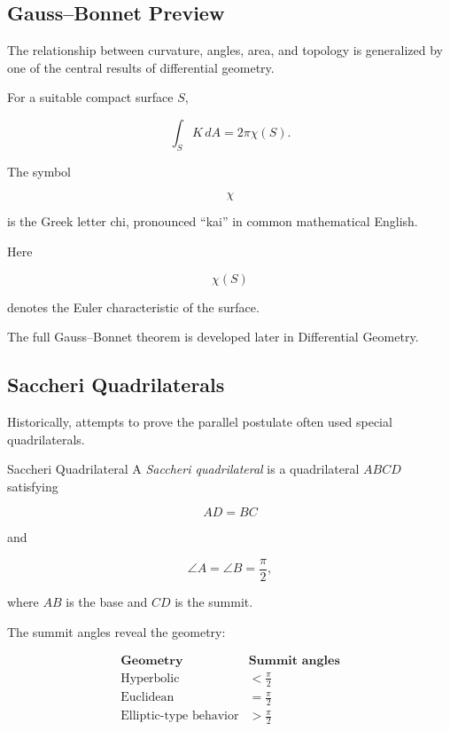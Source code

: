 \subsection{Gauss--Bonnet Preview}
\label{subsec:gauss-bonnet-preview}

The relationship between curvature, angles, area, and topology is generalized
by one of the central results of differential geometry.

For a suitable compact surface \(S\),

\[
\boxed{
\int_S K\,dA
=
2\pi\chi(S).
}
\]

The symbol

\[
\chi
\]

is the Greek letter chi, pronounced ``kai'' in common mathematical English.

Here

\[
\chi(S)
\]

denotes the Euler characteristic of the surface.

The full Gauss--Bonnet theorem is developed later in Differential Geometry.

\subsection{Saccheri Quadrilaterals}
\label{subsec:saccheri-quadrilaterals}

Historically, attempts to prove the parallel postulate often used special
quadrilaterals.

\begin{definitionbox}{Saccheri Quadrilateral}
A \emph{Saccheri quadrilateral} is a quadrilateral \(ABCD\) satisfying

\[
AD=BC
\]

and

\[
\angle A=\angle B=\frac{\pi}{2},
\]

where \(AB\) is the base and \(CD\) is the summit.
\end{definitionbox}

The summit angles reveal the geometry:

\[
\begin{array}{c|c}
\textbf{Geometry} & \textbf{Summit angles}\\
\hline
\text{Hyperbolic} & <\frac{\pi}{2}\\
\text{Euclidean} & =\frac{\pi}{2}\\
\text{Elliptic-type behavior} & >\frac{\pi}{2}
\end{array}
\]

